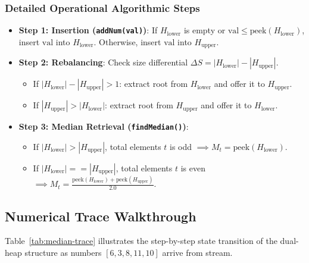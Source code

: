 \documentclass[10pt,journal,compsoc,onecolumn]{IEEEtran}
\begin{document}
\subsubsection{Detailed Operational Algorithmic Steps}

\begin{itemize}
    \item \textbf{Step 1: Insertion (\texttt{addNum(val)})}:
    If $H_{\text{lower}}$ is empty or $\text{val} \le \text{peek}(H_{\text{lower}})$, insert $\text{val}$ into $H_{\text{lower}}$. Otherwise, insert $\text{val}$ into $H_{\text{upper}}$.
    
    \item \textbf{Step 2: Rebalancing}:
    Check size differential $\Delta S = |H_{\text{lower}}| - |H_{\text{upper}}|$.
    \begin{itemize}
        \item If $|H_{\text{lower}}| - |H_{\text{upper}}| > 1$: extract root from $H_{\text{lower}}$ and offer it to $H_{\text{upper}}$.
        \item If $|H_{\text{upper}}| > |H_{\text{lower}}|$: extract root from $H_{\text{upper}}$ and offer it to $H_{\text{lower}}$.
    \end{itemize}

    \item \textbf{Step 3: Median Retrieval (\texttt{findMedian()})}:
    \begin{itemize}
        \item If $|H_{\text{lower}}| > |H_{\text{upper}}|$, total elements $t$ is odd $\implies M_t = \text{peek}(H_{\text{lower}})$.
        \item If $|H_{\text{lower}}| == |H_{\text{upper}}|$, total elements $t$ is even $\implies M_t = \frac{\text{peek}(H_{\text{lower}}) + \text{peek}(H_{\text{upper}})}{2.0}$.
    \end{itemize}
\end{itemize}

\subsection{Numerical Trace Walkthrough}

Table~\ref{tab:median-trace} illustrates the step-by-step state transition of the dual-heap structure as numbers $[6, 3, 8, 11, 10]$ arrive from stream.
\end{document}
